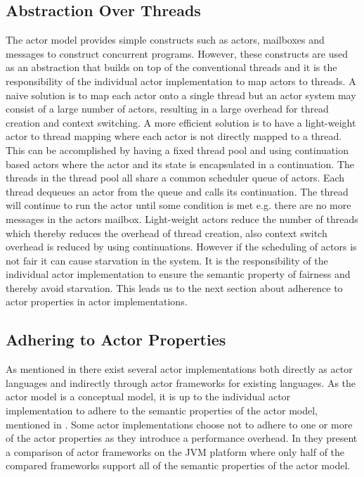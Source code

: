\subsection{Abstraction Over Threads}\label{ssec:abstraction_over_threads}
The actor model provides simple constructs such as actors, mailboxes and messages to construct concurrent programs. However, these constructs are used as an abstraction that builds on top of the conventional threads and it is the responsibility of the individual actor implementation to map actors to threads. A naive solution is to map each actor onto a single thread but an actor system may consist of a large number of actors, resulting in a large overhead for thread creation and context switching\cite[p. 7]{karmani2009actor}. A more efficient solution is to have a light-weight actor to thread mapping where each actor is not directly mapped to a thread. This can be accomplished by having a fixed thread pool and using continuation based actors where the actor and its state is encapsulated in a continuation. The threads in the thread pool all share a common scheduler queue of actors. Each thread dequeues an actor from the queue and calls its continuation. The thread will continue to run the actor until some condition is met e.g. there are no more messages in the actors mailbox. Light-weight actors reduce the number of threads which thereby reduces the overhead of thread creation, also context switch overhead is reduced by using continuations. However if the scheduling of actors is not fair it can cause starvation in the system\cite{karmani2009actor}. It is the responsibility of the individual actor implementation to ensure the semantic property of fairness and thereby avoid starvation. This leads us to the next section about adherence to actor properties in actor implementations.

\subsection{Adhering to Actor Properties}\label{ssec:adhere_actor_prop}
As mentioned in  there exist several actor implementations both directly as actor languages and indirectly through actor frameworks for existing languages. As the actor model is a conceptual model, it is up to the individual actor implementation to adhere to the semantic properties of the actor model, mentioned in . Some actor implementations choose not to adhere to one or more of the actor properties as they introduce a performance overhead. In \cite{karmani2009actor} they present a comparison of actor frameworks on the JVM platform where only half of the compared frameworks support all of the semantic properties of the actor model. 

